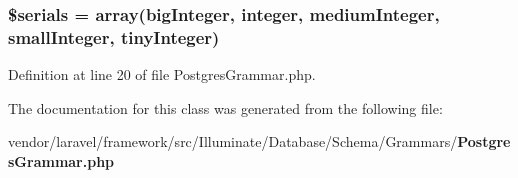\subsubsection[{\$serials}]{\setlength{\rightskip}{0pt plus 5cm}\$serials = array(\textquotesingle{}big\+Integer\textquotesingle{}, \textquotesingle{}integer\textquotesingle{}, \textquotesingle{}medium\+Integer\textquotesingle{}, \textquotesingle{}small\+Integer\textquotesingle{}, \textquotesingle{}tiny\+Integer\textquotesingle{})\hspace{0.3cm}{\ttfamily [protected]}}\label{class_illuminate_1_1_database_1_1_schema_1_1_grammars_1_1_postgres_grammar_a151ecd4bab2e85de938891e925a040c2}


Definition at line 20 of file Postgres\+Grammar.\+php.



The documentation for this class was generated from the following file\+:\begin{DoxyCompactItemize}
\item 
vendor/laravel/framework/src/\+Illuminate/\+Database/\+Schema/\+Grammars/{\bf Postgres\+Grammar.\+php}\end{DoxyCompactItemize}
